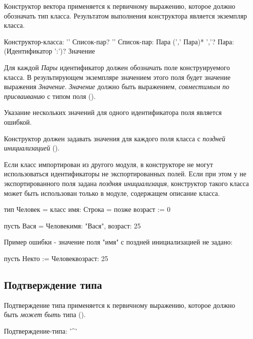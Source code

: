 Конструктор вектора применяется к первичному выражению, которое должно обозначать тип класса. 
Результатом выполнения конструктора является экземпляр класса.

\begin{Grammar}
Конструктор-класса: '{' Список-пар? '}' 
Список-пар: Пара (',' Пара)* ','?
Пара: (Идентификатор ':')? Значение
\end{Grammar}   

Для каждой \emph{Пары} идентификатор должен обозначать поле конструируемого класса. 
В результирующем экземпляре значением этого поля будет значение выражения \emph{Значение}.    
\emph{Значение} должно быть выражением, \emph{совместимым по присваиванию} с типом поля ().

Указание нескольких значений для одного идентификатора поля является ошибкой.

Конструктор должен задавать значения для каждого поля класса с \emph{поздней инициализацией} ().

Если класс импортирован из другого модуля, в конструкторе не могут использоваться идентификаторы не экспортированных полей. 
Если при этом у не экспортированного поля задана \emph{поздняя инициализация}, конструктор такого класса может быть использован только в модуле,
содержащем описание класса.

\begin{Trivil}[vspace=2pt]
тип Человек = класс {
    имя: Строка = позже
    возраст := 0
}

пусть Вася = Человек{имя: "Вася", возраст: 25}
\end{Trivil}

Пример ошибки - значение поля "имя" с поздней инициализацией не задано:
\begin{SampleErr}[vspace=2pt]
пусть Некто := Человек{возраст: 25}
\end{SampleErr}

\hypertarget{confirmation}{%
\subsection{Подтверждение типа}\label{expr:confirmation}}

Подтверждение типа применяется к первичному выражению, которое должно быть \emph{может быть} типа (). 

\begin{Grammar}
Подтверждение-типа: '^'
\end{Grammar}   

